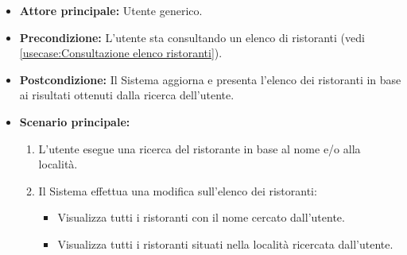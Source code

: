 \label{usecase:Ricerca ristoranti}
\begin{itemize}
	\item \textbf{Attore principale:} Utente generico.
	
	\item \textbf{Precondizione:} L'utente sta consultando un elenco di ristoranti (vedi \autoref{usecase:Consultazione elenco ristoranti}).

	\item \textbf{Postcondizione:} Il Sistema aggiorna e presenta l'elenco dei ristoranti in base ai risultati ottenuti dalla ricerca dell'utente.
 
	      
	\item \textbf{Scenario principale:}
	      \begin{enumerate}
		      \item L'utente esegue una ricerca del ristorante in base al nome e/o alla località.

		      \item Il Sistema effettua una modifica sull'elenco dei ristoranti:
		      \begin{itemize}
                \item Visualizza tutti i ristoranti con il nome cercato dall'utente.
                \item Visualizza tutti i ristoranti situati nella località ricercata dall'utente.
              \end{itemize}
	      \end{enumerate}
\end{itemize}


